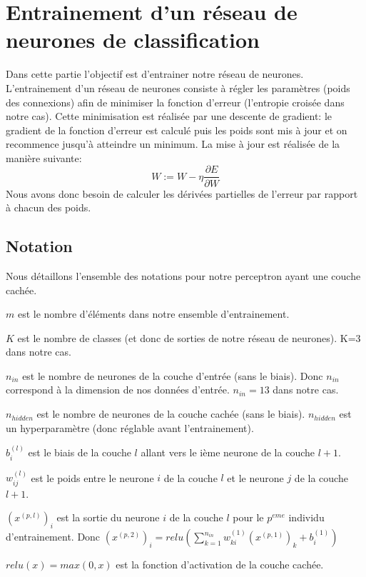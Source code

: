 \documentclass[a4paper,11pt,oneside,roman]{article}
\begin{document}
    \section{Entrainement d'un réseau de neurones de classification}
    Dans cette partie l'objectif est d'entrainer notre réseau de neurones.
    L'entrainement d'un réseau de neurones consiste à régler les paramètres (poids des connexions) afin de minimiser la fonction d'erreur (l'entropie croisée dans notre cas).
    Cette minimisation est réalisée par une descente de gradient: le gradient de la fonction d'erreur est calculé puis les poids sont mis à jour et on recommence jusqu'à atteindre un minimum.
    La mise à jour est réalisée de la manière suivante:
    \begin{equation}
        \nonumber
        W := W - \eta \frac{\partial E}{\partial W}
    \end{equation}
    Nous avons donc besoin de calculer les dérivées partielles de l'erreur par rapport à chacun des poids.
    \subsection{Notation}

    Nous détaillons l'ensemble des notations pour notre perceptron ayant une couche cachée.

    $m$ est le nombre d'éléments dans notre ensemble d'entrainement.

    $K$ est le nombre de classes (et donc de sorties de notre réseau de neurones). K=3 dans notre cas.

    $n_{in}$ est le nombre de neurones de la couche d'entrée (sans le biais). 
    Donc $n_{in}$ correspond à la dimension de nos données d'entrée. $n_{in} = 13$ dans notre cas.

    $n_{hidden}$ est le nombre de neurones de la couche cachée (sans le biais). $n_{hidden}$ est un hyperparamètre (donc réglable avant l'entrainement).

    $b_i^{(l)}$ est le biais de la couche $l$ allant vers le ième neurone de la couche $l+1$.

    $w_{ij}^{(l)}$ est le poids entre le neurone $i$ de la couche $l$ et le neurone $j$ de la couche $l+1$.
    
    $(x^{(p,l)})_{i}$ est la sortie du neurone $i$ de la couche $l$ pour le $p^{eme}$ individu d'entrainement. 
    Donc $(x^{(p,2)})_{i} = relu(\sum\limits_{k=1}^{n_{in}} w_{ki}^{(1)}(x^{(p,1)})_{k} + b_i^{(1)})$
    
    $relu(x) = max(0,x)$ est la fonction d'activation de la couche cachée.
\end{document}
